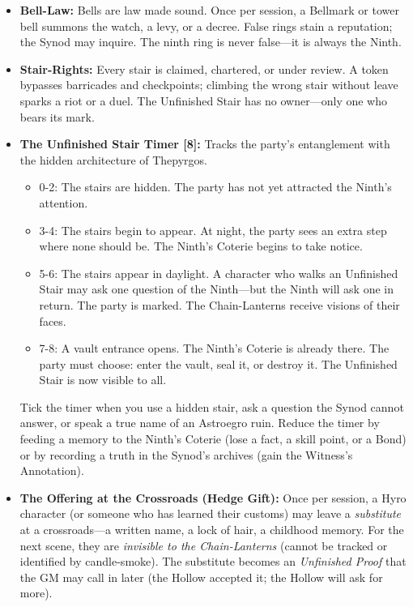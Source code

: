 \begin{itemize}
\item \textbf{Bell-Law:} Bells are law made sound. Once per session, a Bellmark or tower bell summons the watch, a levy, or a decree. False rings stain a reputation; the Synod may inquire. The ninth ring is never false---it is always the Ninth.

\item \textbf{Stair-Rights:} Every stair is claimed, chartered, or under review. A token bypasses barricades and checkpoints; climbing the wrong stair without leave sparks a riot or a duel. The Unfinished Stair has no owner---only one who bears its mark.

\item \textbf{The Unfinished Stair Timer [8]:} Tracks the party's entanglement with the hidden architecture of Thepyrgos.
  \begin{itemize}
    \item 0-2: The stairs are hidden. The party has not yet attracted the Ninth's attention.
    \item 3-4: The stairs begin to appear. At night, the party sees an extra step where none should be. The Ninth's Coterie begins to take notice.
    \item 5-6: The stairs appear in daylight. A character who walks an Unfinished Stair may ask one question of the Ninth---but the Ninth will ask one in return. The party is marked. The Chain-Lanterns receive visions of their faces.
    \item 7-8: A vault entrance opens. The Ninth's Coterie is already there. The party must choose: enter the vault, seal it, or destroy it. The Unfinished Stair is now visible to all.
  \end{itemize}
  Tick the timer when you use a hidden stair, ask a question the Synod cannot answer, or speak a true name of an Astroegro ruin. Reduce the timer by feeding a memory to the Ninth's Coterie (lose a fact, a skill point, or a Bond) or by recording a truth in the Synod's archives (gain the Witness's Annotation).

\item \textbf{The Offering at the Crossroads (Hedge Gift):} Once per session, a Hyro character (or someone who has learned their customs) may leave a \emph{substitute} at a crossroads---a written name, a lock of hair, a childhood memory. For the next scene, they are \emph{invisible to the Chain-Lanterns} (cannot be tracked or identified by candle-smoke). The substitute becomes an \emph{Unfinished Proof} that the GM may call in later (the Hollow accepted it; the Hollow will ask for more).


\end{itemize}
